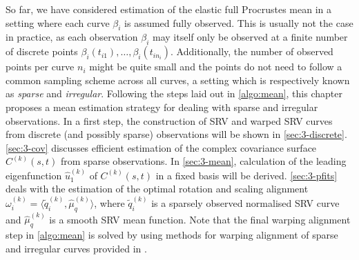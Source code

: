 \label{sec:3}
So far, we have considered estimation of the elastic full Procrustes mean in a setting where each curve $\beta_i$ is assumed fully observed.
This is usually not the case in practice, as each observation $\beta_i$ may itself only be observed at a finite number of discrete points $\beta_i(t_{i1}), \dots, \beta_i(t_{in_i})$.
Additionally, the number of observed points per curve $n_i$ might be quite small and the points do not need to follow a common sampling scheme across all curves, a setting which is respectively known as \emph{sparse} and \emph{irregular}.
Following the steps laid out in \cref{algo:mean}, this chapter proposes a mean estimation strategy for dealing with sparse and irregular observations.
In a first step, the construction of SRV and warped SRV curves from discrete (and possibly sparse) observations will be shown in \cref{sec:3-discrete}.
\cref{sec:3-cov} discusses efficient estimation of the complex covariance surface $C^{(k)}(s,t)$ from sparse observations.
In \cref{sec:3-mean}, calculation of the leading eigenfunction $\hat u^{(k)}_1$ of $C^{(k)}(s,t)$ in a fixed basis will be derived.
\cref{sec:3-pfits} deals with the estimation of the optimal rotation and scaling alignment $\omega_i^{(k)} = \langle \widetilde q_i^{(k)}, \hat\mu^{(k)}_q \rangle$, where $\widetilde q_i^{(k)}$ is a sparsely observed normalised SRV curve and $\hat\mu^{(k)}_q$ is a smooth SRV mean function.
Note that the final warping alignment step in \cref{algo:mean} is solved by using methods for warping alignment of sparse and irregular curves provided in \cite{Steyer2021}.



